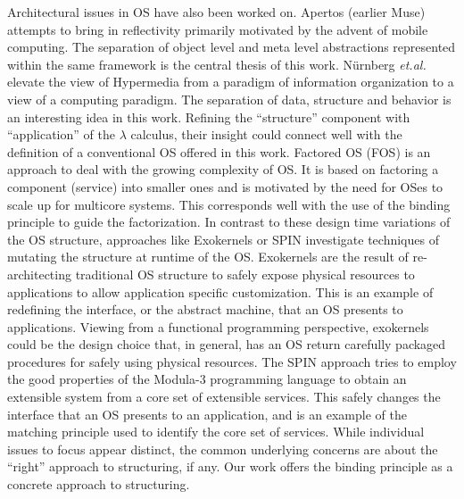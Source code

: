 \documentclass[draft]{article}
\def\etal{{\it et.al.}\ }
\begin{document}
Architectural issues in OS have also been worked on.  Apertos (earlier
Muse)
\cite{Yokote:1992:ARO:141936.141970,Yokote:1991:MOA:122120.122122,Yokote:1992:NSO:506378.506427}
attempts to  bring in reflectivity \cite{Smith:1984:RSL:800017.800513}
primarily motivated by the advent of mobile computing.  The separation
of  object level and  meta level  abstractions represented  within the
same framework is  the central thesis of this  work.  N\"urnberg \etal
\cite{Nurnberg:1996:HOS:234828.234847} elevate  the view of Hypermedia
from a paradigm  of information organization to a  view of a computing
paradigm.   The  separation of  data,  structure  and  behavior is  an
interesting idea  in this work.  Refining  the ``structure'' component
with ``application''  of the  $\lambda$ calculus, their  insight could
connect well with the definition  of a conventional OS offered in this
work.  Factored  OS (FOS) \cite{Wentzlaff:2009:FOS:1531793.1531805} is
an approach to deal with the growing complexity of OS.  It is based on
factoring a component (service) into  smaller ones and is motivated by
the need for OSes to scale up for multicore systems.  This corresponds
well with the use of the binding principle to guide the factorization.
In  contrast to  these design  time  variations of  the OS  structure,
approaches like Exokernels or  SPIN investigate techniques of mutating
the    structure     at    runtime    of     the    OS.     Exokernels
\cite{Engler:1995:EOS:224056.224076} are the result of re-architecting
traditional  OS  structure  to  safely expose  physical  resources  to
applications to allow application  specific customization.  This is an
example of redefining the interface,  or the abstract machine, that an
OS presents  to applications.   Viewing from a  functional programming
perspective, exokernels  could be the design choice  that, in general,
has  an  OS return  carefully  packaged  procedures  for safely  using
physical  resources.   The SPIN  \cite{Bershad:1995:ESP:224057.224077}
approach  tries  to  employ   the  good  properties  of  the  Modula-3
programming language to obtain an extensible system from a core set of
extensible  services.  This safely  changes the  interface that  an OS
presents  to  an  application,  and  is an  example  of  the  matching
principle used to identify the core set of services.  While individual
issues to  focus appear distinct,  the common underlying  concerns are
about the ``right'' approach to  structuring, if any.  Our work offers
the binding principle as a concrete approach to structuring.
\end{document}

